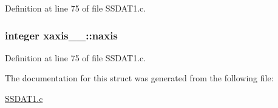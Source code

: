 Definition at line 75 of file S\+S\+D\+A\+T1.\+c.

\subsubsection[{\texorpdfstring{naxis}{naxis}}]{\setlength{\rightskip}{0pt plus 5cm}integer xaxis\+\_\+\_\+\+::naxis}\hypertarget{structxaxis__1___ae5c943405bf2d5a323f6f2997afe2888}{}\label{structxaxis__1___ae5c943405bf2d5a323f6f2997afe2888}


Definition at line 75 of file S\+S\+D\+A\+T1.\+c.



The documentation for this struct was generated from the following file\+:\begin{DoxyCompactItemize}
\item 
\hyperlink{SSDAT1_8c}{S\+S\+D\+A\+T1.\+c}\end{DoxyCompactItemize}
